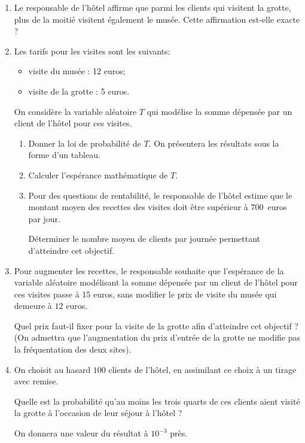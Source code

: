 \documentclass[10pt]{article}
\begin{document}
\begin{enumerate}[resume,start=2]
\item Le responsable de l'hôtel affirme que parmi les clients qui visitent la grotte, plus de la moitié visitent également le musée. Cette affirmation est-elle exacte ?
\item Les tarifs pour les visites sont les suivants:

\begin{itemize}
\item[$\bullet~~$] visite du musée : 12 euros;
\item[$\bullet~~$] visite de la grotte : 5 euros.
\end{itemize}

On considère la variable aléatoire $T$ qui modélise la somme dépensée par un client de l'hôtel pour ces visites.
	\begin{enumerate}
		\item Donner la loi de probabilité de $T$. On présentera les résultats sous la forme d'un tableau.
		\item Calculer l'espérance mathématique de $T$.
		\item Pour des questions de rentabilité, le responsable de l'hôtel estime que le montant
moyen des recettes des visites doit être supérieur à $700$~euros par jour. 

Déterminer le nombre moyen de clients par journée permettant d'atteindre cet objectif.
	\end{enumerate}
\item Pour augmenter les recettes, le responsable souhaite que l'espérance de la variable aléatoire modélisant la somme dépensée par un client de l'hôtel pour ces visites passe à 15 euros, sans modifier le prix de visite du musée qui demeure à $12$ euros. 

Quel prix faut-il fixer pour la visite de la grotte afin d'atteindre cet objectif ? (On admettra que l'augmentation du prix d'entrée de la grotte ne modifie pas la fréquentation des deux sites).
\item On choisit au hasard $100$ clients de l'hôtel, en assimilant ce choix à un tirage avec remise.

Quelle est la probabilité qu'au moins les trois quarts de ces clients aient visité la grotte à l'occasion de leur séjour à l'hôtel ? 

On donnera une valeur du résultat à $10^{-3}$ près.
\end{enumerate}
\end{document}
